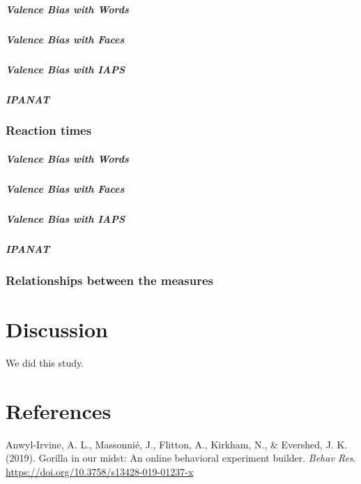 \documentclass[man]{apa6}
\let\oldsubparagraph\subparagraph
\renewcommand{\subparagraph}[1]{\oldsubparagraph{#1}\mbox{}}
\begin{document}
\hypertarget{valence-bias-with-words-1}{%
\subparagraph{Valence Bias with Words}\label{valence-bias-with-words-1}}

\hypertarget{valence-bias-with-faces-1}{%
\subparagraph{Valence Bias with Faces}\label{valence-bias-with-faces-1}}

\hypertarget{valence-bias-with-iaps-1}{%
\subparagraph{Valence Bias with IAPS}\label{valence-bias-with-iaps-1}}

\hypertarget{ipanat-3}{%
\subparagraph{IPANAT}\label{ipanat-3}}

\hypertarget{reaction-times-1}{%
\subsubsection{Reaction times}\label{reaction-times-1}}

\hypertarget{valence-bias-with-words-2}{%
\subparagraph{Valence Bias with Words}\label{valence-bias-with-words-2}}

\hypertarget{valence-bias-with-faces-2}{%
\subparagraph{Valence Bias with Faces}\label{valence-bias-with-faces-2}}

\hypertarget{valence-bias-with-iaps-2}{%
\subparagraph{Valence Bias with IAPS}\label{valence-bias-with-iaps-2}}

\hypertarget{ipanat-4}{%
\subparagraph{IPANAT}\label{ipanat-4}}

\hypertarget{relationships-between-the-measures}{%
\subsubsection{Relationships between the measures}\label{relationships-between-the-measures}}

\hypertarget{discussion}{%
\section{Discussion}\label{discussion}}

We did this study.

\newpage

\hypertarget{references}{%
\section{References}\label{references}}

\begingroup
\setlength{\parindent}{-0.5in}
\setlength{\leftskip}{0.5in}

\hypertarget{refs}{}
\leavevmode\hypertarget{ref-anwyl-irvine_gorilla_2019}{}%
Anwyl-Irvine, A. L., Massonnié, J., Flitton, A., Kirkham, N., \& Evershed, J. K. (2019). Gorilla in our midst: An online behavioral experiment builder. \emph{Behav Res}. \url{https://doi.org/10.3758/s13428-019-01237-x}
\end{document}
